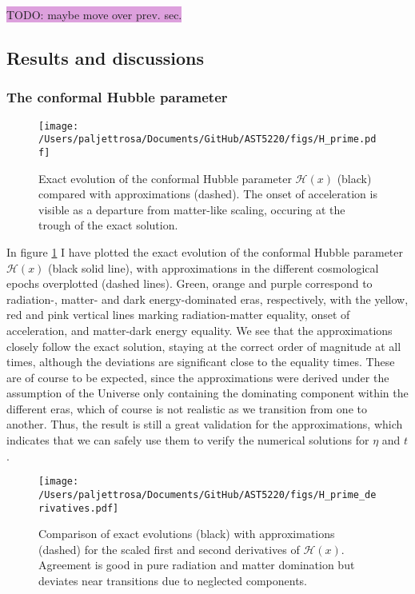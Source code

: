 \documentclass{aa}
\numberwithin{equation}{section}
\numberwithin{table}{section}
\numberwithin{figure}{section}
\begin{document}
\colorbox{Plum}{TODO: maybe move over prev. sec.}


\subsection{Results and discussions}\label{subsec: I results}

\subsubsection{The conformal Hubble parameter}
\begin{figure}
  \centering
  \texttt{[image: /Users/paljettrosa/Documents/GitHub/AST5220/figs/H\_prime.pdf]}
  \caption{Exact evolution of the conformal Hubble parameter $\mathcal{H}(x)$ (black) compared with approximations (dashed). The onset of acceleration is visible as a departure from matter-like scaling, occuring at the trough of the exact solution.}\label{fig:H_prime}
\end{figure}


In figure \ref{fig:H_prime} I have plotted the exact evolution of the conformal Hubble parameter $\mathcal{H}(x)$ (black solid line), with approximations in the different cosmological epochs overplotted (dashed lines). Green, orange and purple correspond to radiation-, matter- and dark energy-dominated eras, respectively, with the yellow, red and pink vertical lines marking radiation-matter equality, onset of acceleration, and matter-dark energy equality. We see that the approximations closely follow the exact solution, staying at the correct order of magnitude at all times, although the deviations are significant close to the equality times. These are of course to be expected, since the approximations were derived under the assumption of the Universe only containing the dominating component within the different eras, which of course is not realistic as we transition from one to another. Thus, the result is still a great validation for the approximations, which indicates that we can safely use them to verify the numerical solutions for $\eta$ and $t$.

\begin{figure*}
    \centering
    \texttt{[image: /Users/paljettrosa/Documents/GitHub/AST5220/figs/H\_prime\_derivatives.pdf]}
    \caption{Comparison of exact evolutions (black) with approximations (dashed) for the scaled first and second derivatives of $\mathcal{H}(x)$. Agreement is good in pure radiation and matter domination but deviates near transitions due to neglected components.}\label{fig:H_prime derivatives}
\end{figure*}
\end{document}
